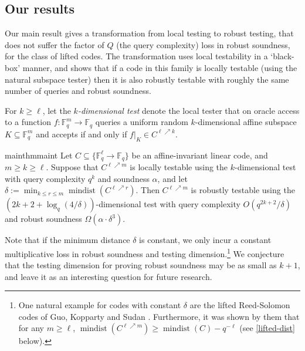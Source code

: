\documentclass{toc}
\theoremstyle{plain}
\DeclareMathOperator{\mindist}{mindist}  %
\newcommand{\F}{{\mathbb{F}}}
\newcommand{\Func}[1]{\{\F_q^{#1} \to \F_q\}}
\begin{document}
\subsection{Our results}

Our main result gives a transformation from local testing to robust testing,  that does not suffer the factor of $Q$ (the query complexity) loss in robust soundness, for the class of lifted codes. The transformation uses local testability in a `black-box' manner, and shows that if a code in this family is locally testable (using the natural subspace tester) then it is also robustly testable with roughly the same number of queries and robust soundness.

For $k \geq \ell$, let the
%
%
%
%
%
\emph{$k$-dimensional test}
denote the local tester that on oracle access to a function 
$f: \F_q^m \to \F_q$ queries a uniform random $k$-dimensional 
affine subspace
%
$K \subseteq \F_q^m$  %
and accepts if and only if $f|_K \in C^{\ell \nearrow k}$.

\begin{restatable}{mainthm}{maint}\label{thm:main}
%
Let $C \subseteq \Func{\ell}$ be an affine-invariant linear code, and
$m \geq k \geq \ell$. Suppose that $C^{\ell \nearrow m}$ is locally 
testable using the
$k$-dimensional test with query complexity $q^{k}$ and soundness $\alpha$, 
and let  $\delta:= \min_{ k \leq r \leq m}\mindist(C^{\ell \nearrow r})$.
Then $C^{\ell \nearrow m}$ is robustly testable using the $(2k+2+\log_q(4/\delta))$-dimensional test
 with query complexity $O(q^{2k+2}/\delta)$ and
  robust soundness $\Omega(\alpha \cdot \delta^3)$.
%
\end{restatable}
  
Note that if the %
minimum  %
distance $\delta$ is constant, we only incur a constant multiplicative loss in robust soundness and testing dimension.\footnote{One natural example for codes with constant $\delta$ are the lifted Reed-Solomon codes of Guo, Kopparty and Sudan \cite{GuoKS2013}. Furthermore, it was shown by them \cite{GuoKS2013} that for any $m \geq \ell$, $\mindist(C^{\ell \nearrow m})\geq\mindist(C)-q^{-\ell}$ (see \cref{lifted-dist} below).} We conjecture that the testing dimension for proving robust soundness may be as small as $k+1$, and leave it as an interesting question for future research.
\end{document}

